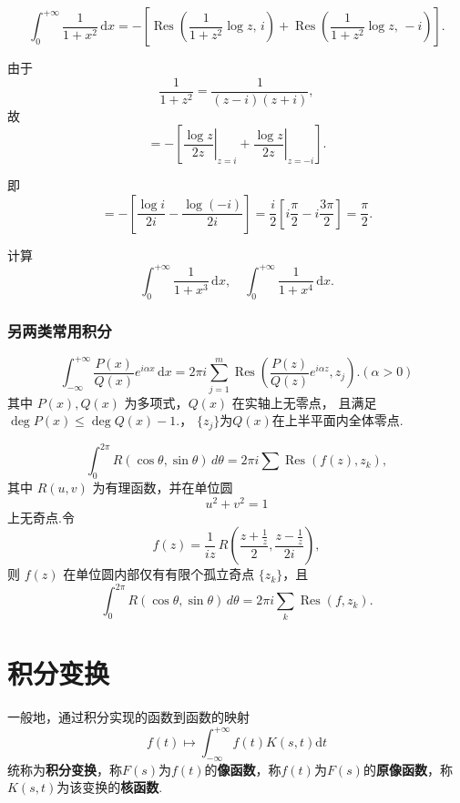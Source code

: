 \documentclass[openany,oneside]{ctexbook}
\begin{document}
\begin{solution}
  \[
\int_{0}^{+\infty} \frac{1}{1+x^2}\,\mathrm{d}x
=
-\left[
\operatorname{Res}\!\left( \frac{1}{1+z^2}\log z ,\, i \right)
+
\operatorname{Res}\!\left( \frac{1}{1+z^2}\log z ,\, -i \right)
\right].
\]

由于
\[
\frac{1}{1+z^2} = \frac{1}{(z-i)(z+i)},
\]
故
\[
=
-\left[
\left.\frac{\log z}{2z}\right|_{z=i}
+
\left.\frac{\log z}{2z}\right|_{z=-i}
\right].
\]

即
\[
=
-\left[
\frac{\log i}{2i}
-
\frac{\log(-i)}{2i}
\right]
=
\frac{i}{2}
\left[
i\frac{\pi}{2}
-
i\frac{3\pi}{2}
\right]
=
\frac{\pi}{2}.
\]
\end{solution}
\begin{example}[习题]
计算
\[
\int_{0}^{+\infty} \frac{1}{1+x^3}\,\mathrm{d}x, \quad
\int_{0}^{+\infty} \frac{1}{1+x^4}\,\mathrm{d}x .
\]
\end{example}
\subsection{另两类常用积分}
\begin{proposition}
\[
\int_{-\infty}^{+\infty}\frac{P(x)}{Q(x)}e^{i\alpha x}\,\mathrm{d}x=2\pi i\sum_{j=1}^{m}
\operatorname{Res}\!\left(\frac{P(z)}{Q(z)}e^{i\alpha z},z_j\right).
(\alpha > 0)
\]
其中 $P(x),Q(x)$ 为多项式，$Q(x)$ 在实轴上无零点，
且满足
$
\deg P(x)\le \deg Q(x)-1.
$，
$\{z_j\}$为$Q(x)$在上半平面内全体零点.
\end{proposition}
\begin{proposition}
\[
\int_{0}^{2\pi} R(\cos\theta,\sin\theta)\,d\theta
=2\pi i \sum \operatorname{Res}\left(f(z),z_k\right),
\]
其中 $R(u,v)$ 为有理函数，并在单位圆
\[
u^2+v^2=1
\]
上无奇点.令
\[
f(z)
=
\frac{1}{iz}\,
R\!\left(
\frac{z+\frac{1}{z}}{2},
\frac{z-\frac{1}{z}}{2i}
\right),
\]
则 $f(z)$ 在单位圆内部仅有有限个孤立奇点 $\{z_k\}$，且
\[
\int_{0}^{2\pi} R(\cos\theta,\sin\theta)\,d\theta
=
2\pi i \sum_k \operatorname{Res}(f,z_k).
\]
\end{proposition}

\chapter{积分变换}
一般地，通过积分实现的函数到函数的映射
\begin{equation}
    f(t)\mapsto\int_{-\infty}^{+\infty}f(t)K(s,t)\mathrm{d}t
\end{equation}
统称为\textbf{积分变换}，称$F(s)$为$f(t)$的\textbf{像函数}，称$f(t)$为$F(s)$的\textbf{原像函数}，称$K(s,t)$为该变换的\textbf{核函数}.
\end{document}
